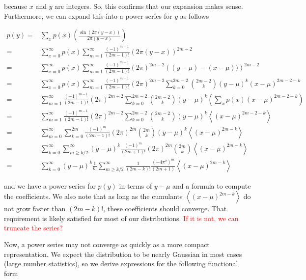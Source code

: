 \documentclass{article}
\newcommand{\e}[1]{\left<#1\right>}
\begin{document}
\noindent
because $x$ and $y$ are integers. 
So, this confirms that our expansion makes sense. 
Furthermore, we can expand this into a power series for $y$ as follows

\begin{subequations}
	\begin{align}
		p(y) = & \sum_x p(x) \left( \frac{ \sin(2\pi (y-x) ) } { 2\pi (y-x) } \right) \\
		     = & \sum_{x=0}^{\infty} p(x) \sum_{m=1}^{\infty} \frac{(-1)^{m-1}}{(2m-1)!} \left(2\pi(y-x)\right)^{2m-2} \\
		     = & \sum_{x=0}^{\infty} p(x) \sum_{m=1}^{\infty} \frac{(-1)^{m-1}}{(2m-1)!} (2\pi)^{2m-2} \left((y-\mu)-(x-\mu))\right)^{2m-2} \\
		     = & \sum_{x=0}^{\infty} p(x) \sum_{m=1}^{\infty} \frac{(-1)^{m-1}}{(2m-1)!} (2\pi)^{2m-2} \sum_{k=0}^{2m-2} {2m-2 \choose k } (y-\mu)^k (x-\mu)^{2m-2-k} \\
		     = & \sum_{m=1}^{\infty} \frac{(-1)^{m-1}}{(2m-1)!} (2\pi)^{2m-2} \sum_{k=0}^{2m-2} {2m-2 \choose k } (y-\mu)^k \left(\sum_x p(x) (x-\mu)^{2m-2-k} \right) \\
		     = & \sum_{m=1}^{\infty} \frac{(-1)^{m-1}}{(2m-1)!} (2\pi)^{2m-2} \sum_{k=0}^{2m-2} {2m-2 \choose k } (y-\mu)^k \e{(x-\mu)^{2m-2-k}} \\
		     = & \sum_{m=0}^{\infty} \sum_{k=0}^{2m} \frac{(-1)^{m}}{(2m+1)!} (2\pi)^{2m} {2m \choose k } (y-\mu)^k \e{(x-\mu)^{2m-k}} \\
		     = & \sum_{k=0}^{\infty} \sum_{m\geq k/2}^{\infty} (y-\mu)^k \frac{(-1)^{m}}{(2m+1)!} (2\pi)^{2m} {2m \choose k } \e{(x-\mu)^{2m-k}} \\
		     = & \sum_{k=0}^{\infty} (y-\mu)^k \frac{1}{k!} \sum_{m\geq k/2}^{\infty} \frac{1}{(2m-k)!} \frac{(-4\pi^2)^{m}}{(2m+1)} \e{(x-\mu)^{2m-k}} 
	\end{align}
\end{subequations}

\noindent
and we have a power series for $p(y)$ in terms of $y-\mu$ and a formula to compute the coefficients.
We also note that as long as the cumulants $\e{(x-\mu)^{2m-k}}$ do not grow faster than $(2m-k)!$, these coefficients should converge.
That requirement is likely satisfied for most of our distributions.
\textcolor{red}{
If it is not, we can truncate the series?
}

Now, a power series may not converge as quickly as a more compact representation.
We expect the distribution to be nearly Gaussian in most cases (large number statistics), so we derive expressions for the following functional form
\end{document}

